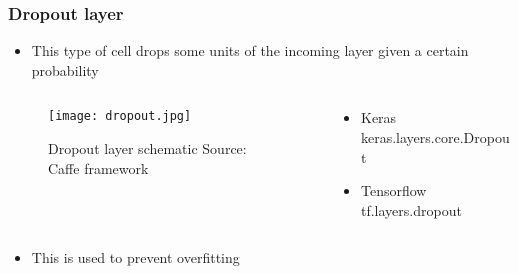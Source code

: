 \documentclass{beamer}
\begin{document}
\begin{frame}
	\frametitle{Dropout layer}
    \begin{itemize}
    \item This type of cell drops some units of the incoming layer given a certain probability
    \end{itemize}
    \begin{columns}[T]
     \begin{column}{.5\textwidth}
    \begin{block}{}
    \begin{figure}
		\texttt{[image: dropout.jpg]}
		\caption{Dropout layer schematic Source: Caffe framework}
	 \end{figure}
    \end{block}
    \end{column}
    \begin{column}{.5\textwidth}
    \begin{block}{}
    \begin{itemize}
    	\item Keras
        keras.layers.core.Dropout
        \item Tensorflow\\
        tf.layers.dropout
    \end{itemize}
    \end{block}
    \end{column}
    \end{columns}
    \begin{itemize}
    \item This is used to prevent overfitting
    \end{itemize}
\end{frame}
\end{document}
